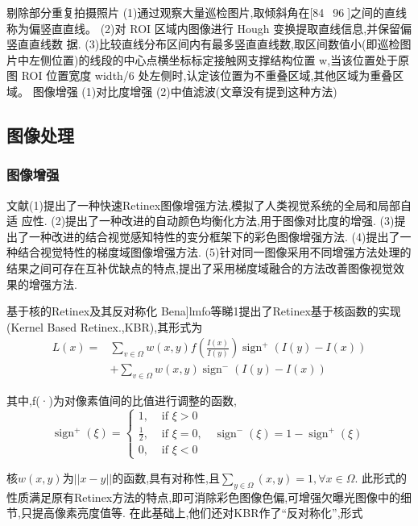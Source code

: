 \documentclass{amsart}
\begin{document}
剔除部分重复拍摄照片
(1)通过观察大量巡检图片,取倾斜角在[84~96]之间的直线称为偏竖直直线。
(2)对 ROI 区域内图像进行 Hough 变换提取直线信息,并保留偏竖直直线数
据.
(3)比较直线分布区间内有最多竖直直线数,取区间数值小(即巡检图片中左侧位置)的线段的中心点横坐标标定接触网支撑结构位置 w,当该位置处于原图 ROI 位置宽度 width/6 处左侧时,认定该位置为不重叠区域,其他区域为重叠区域。
图像增强
(1)对比度增强
(2)中值滤波(文章没有提到这种方法)

\subsection{图像处理}
\label{sec:02}

\subsubsection{图像增强}
\label{sec:0201}

文献\cite{许欣}(1)提出了一种快速Retinex图像增强方法,模拟了人类视觉系统的全局和局部自适
应性.
(2)提出了一种改进的自动颜色均衡化方法,用于图像对比度的增强.
(3)提出了一种改进的结合视觉感知特性的变分框架下的彩色图像增强方法.
(4)提出了一种结合视觉特性的梯度域图像增强方法.
(5)针对同一图像采用不同增强方法处理的结果之间可存在互补优缺点的特点,提出了采用梯度域融合的方法改善图像视觉效果的增强方法.


基于核的Retinex及其反对称化
Bena]lmfo等睇1提出了Retinex基于核函数的实现(Kernel Based Retinex.,KBR),其形式为
\begin{equation}
  \label{eq:08}
\begin{aligned}
L(x)=& \sum_{v \in \Omega} w(x, y) f\left(\frac{I(x)}{I(y)}\right) \operatorname{sign}^{+}(I(y)-I(x)) \\
&+\sum_{v \in \Omega} w(x, y) \operatorname{sign}^{-}(I(y)-I(x))
\end{aligned}
\end{equation}

其中,f(·)为对像素值间的比值进行调整的函数,
\begin{equation}
  \label{eq:09}
\operatorname{sign}^{+}(\xi)=\left\{\begin{array}{ll}
1, & \text { if } \xi>0 \\
\frac{1}{2}, & \text { if } \xi=0, \quad \operatorname{sign}^{-}(\xi)=1-\operatorname{sign}^{+}(\xi) \\
0, & \text { if } \xi<0
\end{array}\right.
\end{equation}

核$w(x,y)$为$||x-y||$的函数,具有对称性,且$\sum_{y\in \Omega}(x,y)=1,\forall x \in \Omega$.
此形式的性质满足原有Retinex方法的特点,即可消除彩色图像色偏,可增强欠曝光图像中的细节,只提高像素亮度值等.
在此基础上,他们还对KBR作了“反对称化”,形式
\end{document}
